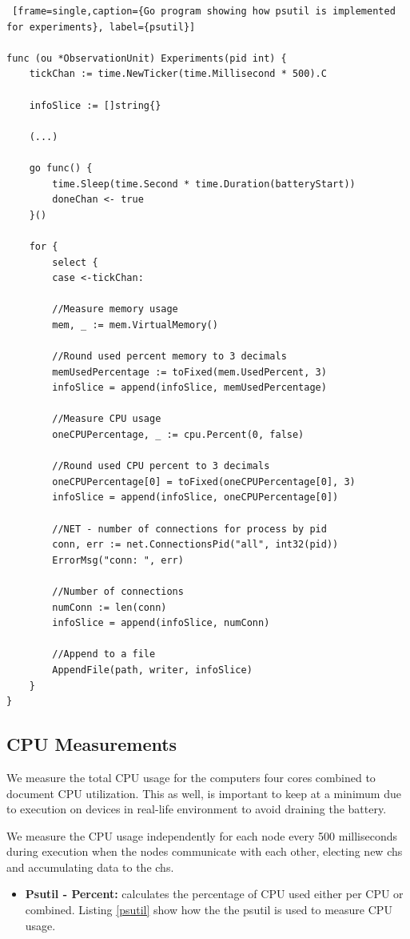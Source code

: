 \documentclass[USenglish]{uit-thesis}
\begin{document}
\begin{lstlisting} [frame=single,caption={Go program showing how psutil is implemented for experiments}, label={psutil}]

func (ou *ObservationUnit) Experiments(pid int) {
	tickChan := time.NewTicker(time.Millisecond * 500).C
	
	infoSlice := []string{}
	
	(...)
	
	go func() {
		time.Sleep(time.Second * time.Duration(batteryStart))
		doneChan <- true
	}()

	for {
		select {
		case <-tickChan:
		
		//Measure memory usage
		mem, _ := mem.VirtualMemory()
		
		//Round used percent memory to 3 decimals
		memUsedPercentage := toFixed(mem.UsedPercent, 3)
		infoSlice = append(infoSlice, memUsedPercentage)
		
		//Measure CPU usage
		oneCPUPercentage, _ := cpu.Percent(0, false)
		
		//Round used CPU percent to 3 decimals
		oneCPUPercentage[0] = toFixed(oneCPUPercentage[0], 3)
		infoSlice = append(infoSlice, oneCPUPercentage[0])
		
		//NET - number of connections for process by pid
		conn, err := net.ConnectionsPid("all", int32(pid))
		ErrorMsg("conn: ", err)
		
		//Number of connections
		numConn := len(conn)
		infoSlice = append(infoSlice, numConn)
		
		//Append to a file
		AppendFile(path, writer, infoSlice) 
	}
}
\end{lstlisting}

\newpage

\subsection{CPU Measurements} \label{eva:cpu_measure}
We measure the total CPU usage for the computers four cores combined to document CPU utilization. This as well, is important to keep at a minimum due to execution on devices in real-life environment to avoid draining the battery.

We measure the CPU usage independently for each node every 500 milliseconds during execution when the nodes communicate with each other, electing new \glspl{ch} and accumulating data to the \glspl{ch}.

\begin{itemize}
\item \textbf{Psutil - Percent:} calculates the percentage of CPU used either per CPU or combined. Listing \ref{psutil} show how the the psutil is used to measure CPU usage.
\end{itemize}
\end{document}
